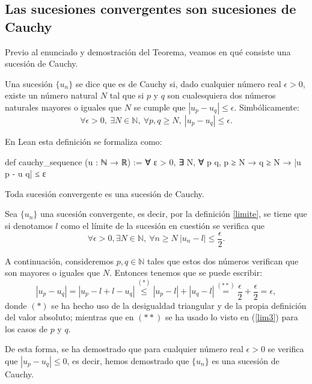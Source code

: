\subsection{Las sucesiones convergentes son sucesiones de Cauchy}
Previo al enunciado y demostración del Teorema, veamos en qué
consiste una sucesión de Cauchy.
\begin{definicion}
	Una sucesión \(\{u_n\}\) se dice que es de Cauchy si,
	dado cualquier número real \(\epsilon >0\),
	existe un número natural \(N\) tal que si \(p\) y \(q\) son
	cualesquiera dos números naturales mayores o iguales que
	\(N\) se cumple que \(|u_p-u_q| \leq \epsilon \).
	Simbólicamente:
	\begin{equation}
	\forall \epsilon >0, \ \exists N \in \mathbb{N}, \
	\forall p, q \geq N, \ |u_p-u_q| \leq \epsilon.
	\end{equation}
\end{definicion}
En Lean esta definición se formaliza como:
\begin{leancode}
def cauchy_sequence (u : ℕ → ℝ) :=
∀ ε > 0, ∃ N, ∀ p q, p ≥ N → q ≥ N → |u p - u q| ≤ ε
\end{leancode}
\begin{teorema}
	Toda sucesión convergente es una sucesión de Cauchy.
\end{teorema}
\begin{demostracion}
	Sea \(\{u_n\}\) una sucesión convergente, es decir,
	por la definición \ref{limite}, se tiene que si denotamos
	\(l\) como el límite de la sucesión en cuestión se verifica que
\begin{equation}\label{lim3}
\forall \epsilon >0, \exists N \in \mathbb{N}, \  \forall n \geq N \
|u_n-l| \leq \frac{\epsilon}{2}.
\end{equation}

A continuación, consideremos \(p,q \in \mathbb{N}\) tales
que estos dos números verifican que son mayores o iguales
que \(N\). Entonces tenemos que se puede escribir:
\begin{equation*}
|u_p-u_q| = |u_p-l+l-u_q| \stackrel{(*)}{\leq} |u_p-l|+|u_q-l|
\stackrel{(**)}{=} \frac{\epsilon}{2}+\frac{\epsilon}{2}=\epsilon,
\end{equation*}
donde \( (*) \) se ha hecho uso de la desigualdad triangular y de
la propia definición del valor absoluto; mientras que en \((**)\)
se ha usado lo visto en (\ref{lim3}) para los casos de \(p\) y \(q\).

De esta forma, se ha demostrado que para cualquier número real \(\epsilon >0\)
se verifica que \( |u_p-u_q| \leq 0\), es decir, hemos demostrado
que \(\{u_n\}\) es una sucesión de Cauchy.
\end{demostracion}

